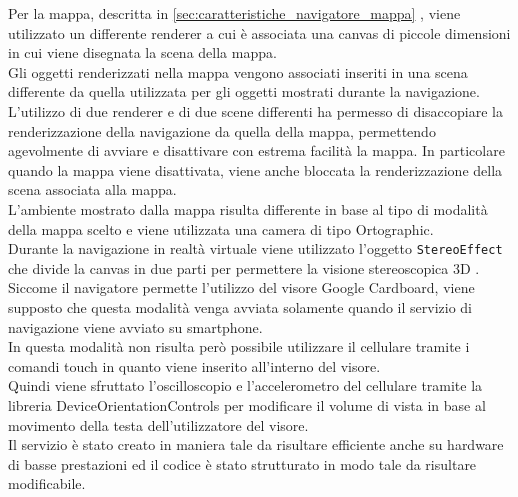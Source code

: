Per la mappa, descritta in \ref{sec:caratteristiche_navigatore_mappa} , viene utilizzato un differente renderer a cui è associata una canvas di piccole dimensioni in cui viene disegnata la scena della mappa.
\\
Gli oggetti renderizzati nella mappa vengono associati inseriti in una scena differente da quella utilizzata per gli oggetti mostrati durante la navigazione.
\\
L’utilizzo di due renderer e di due scene differenti ha permesso di disaccopiare la renderizzazione della navigazione da quella della mappa, permettendo agevolmente di avviare e disattivare con estrema facilità la mappa. In particolare quando la mappa viene disattivata, viene anche bloccata la renderizzazione della scena associata alla mappa.
\\
L’ambiente mostrato dalla mappa risulta differente in base al tipo di modalità della mappa scelto e viene utilizzata una camera di tipo Ortographic.
\\
Durante la navigazione in realtà virtuale viene utilizzato l’oggetto \texttt{StereoEffect} che divide la canvas in due parti per permettere la visione stereoscopica 3D \cite{stereo_effect}.
Siccome il navigatore permette l’utilizzo del visore Google Cardboard, viene supposto che questa modalità venga avviata solamente quando il servizio di navigazione viene avviato su smartphone.
\\
In questa modalità non risulta però possibile utilizzare il cellulare tramite i comandi touch in quanto viene inserito all’interno del visore.
\\
Quindi viene sfruttato l’oscilloscopio e l’accelerometro del cellulare tramite la libreria DeviceOrientationControls per modificare il volume di vista in base al movimento della testa dell’utilizzatore del visore.
\\
Il servizio è stato creato in maniera tale da risultare efficiente anche su hardware di basse prestazioni ed il codice è stato strutturato in modo tale da risultare modificabile.